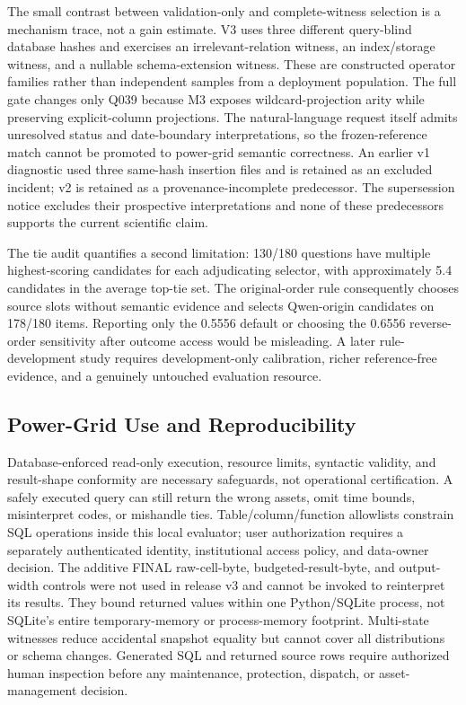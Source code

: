 \documentclass[applsci,article,submit,moreauthors]{Definitions/mdpi}
\begin{document}
The small contrast between validation-only and complete-witness selection is a mechanism trace, not a gain estimate. V3 uses three different query-blind database hashes and exercises an irrelevant-relation witness, an index/storage witness, and a nullable schema-extension witness. These are constructed operator families rather than independent samples from a deployment population. The full gate changes only Q039 because M3 exposes wildcard-projection arity while preserving explicit-column projections. The natural-language request itself admits unresolved status and date-boundary interpretations, so the frozen-reference match cannot be promoted to power-grid semantic correctness. An earlier v1 diagnostic used three same-hash insertion files and is retained as an excluded incident; v2 is retained as a provenance-incomplete predecessor. The supersession notice excludes their prospective interpretations and none of these predecessors supports the current scientific claim.

The tie audit quantifies a second limitation: 130/180 questions have multiple highest-scoring candidates for each adjudicating selector, with approximately 5.4 candidates in the average top-tie set. The original-order rule consequently chooses source slots without semantic evidence and selects Qwen-origin candidates on 178/180 items. Reporting only the 0.5556 default or choosing the 0.6556 reverse-order sensitivity after outcome access would be misleading. A later rule-development study requires development-only calibration, richer reference-free evidence, and a genuinely untouched evaluation resource.

\subsection{Power-Grid Use and Reproducibility}

Database-enforced read-only execution, resource limits, syntactic validity, and result-shape conformity are necessary safeguards, not operational certification. A safely executed query can still return the wrong assets, omit time bounds, misinterpret codes, or mishandle ties. Table/column/function allowlists constrain SQL operations inside this local evaluator; user authorization requires a separately authenticated identity, institutional access policy, and data-owner decision. The additive FINAL raw-cell-byte, budgeted-result-byte, and output-width controls were not used in release v3 and cannot be invoked to reinterpret its results. They bound returned values within one Python/SQLite process, not SQLite's entire temporary-memory or process-memory footprint. Multi-state witnesses reduce accidental snapshot equality but cannot cover all distributions or schema changes. Generated SQL and returned source rows require authorized human inspection before any maintenance, protection, dispatch, or asset-management decision.
\end{document}
